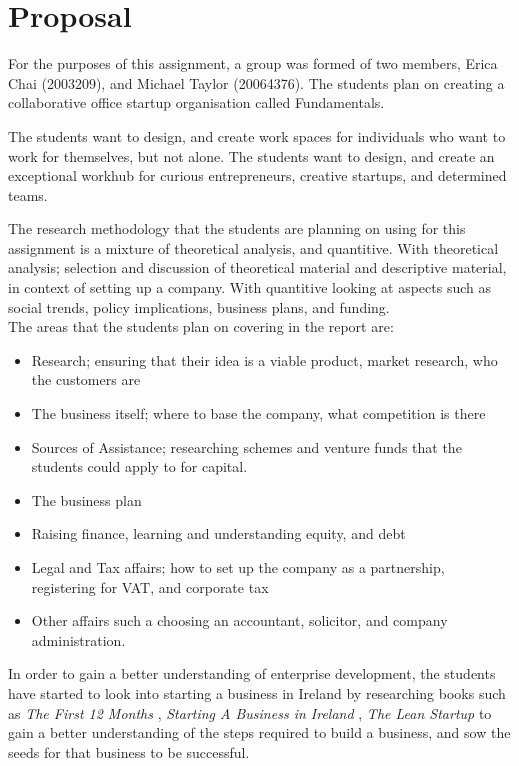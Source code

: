 \newpage
\chapter*{Proposal}

For the purposes of this assignment, a group was formed of two members, Erica Chai (2003209), and Michael Taylor (20064376). The students plan on creating a collaborative office startup organisation called Fundamentals. 

The students want to design, and create work spaces for individuals who want to work for themselves, but not alone. The students want to design, and create an exceptional workhub for curious entrepreneurs, creative startups, and determined teams. 

The research methodology that the students are planning on using for this assignment is a mixture of theoretical analysis, and quantitive. With theoretical analysis; selection and discussion of theoretical material and descriptive material, in context of setting up a company. With quantitive looking at aspects such as social trends, policy implications, business plans, and funding.\\


The areas that the students plan on covering in the report are:
\begin{itemize}
	\item Research; ensuring that their idea is a viable product, market research, who the customers are 
	\item The business itself; where to base the company, what competition is there
	\item Sources of Assistance; researching schemes and venture funds that the students could apply to for capital.
	\item The business plan
	\item Raising finance, learning and understanding equity, and debt
	\item Legal and Tax affairs; how to set up the company as a partnership, registering for VAT, and corporate tax
	\item Other affairs such a choosing an accountant, solicitor, and company administration. 
\end{itemize}

In order to gain a better understanding of enterprise development, the students have started to look into starting a business in Ireland by researching books such as \emph{The First 12 Months} \citep{bangs-90}, \emph{Starting A Business in Ireland} \citep{kane-98}, \emph{The Lean Startup} \citep{ries-11} to gain a better understanding of the steps required to build a business, and sow the seeds for that business to be successful. 